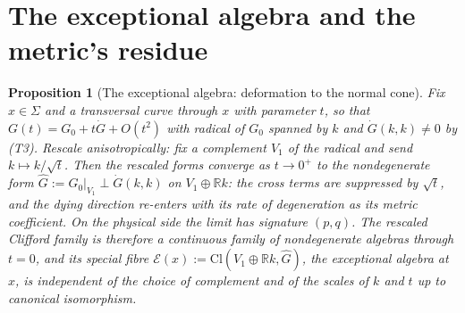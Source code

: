 \documentclass[11pt]{article}
\newtheorem{proposition}[theorem]{Proposition}
\theoremstyle{definition}
\theoremstyle{plain}
\newcommand{\changedmark}[2]{\marginpar{\raggedright\scriptsize\color{#1}#2}}
\providecommand{\Cl}{}\renewcommand{\Cl}{\mathrm{Cl}}
\providecommand{\R}{}\renewcommand{\R}{\mathbb{R}}
\providecommand{\Sig}{}\renewcommand{\Sig}{\Sigma}
\providecommand{\shE}{}\renewcommand{\shE}{\mathcal{E}}
\begin{document}
\section{The exceptional algebra and the metric's residue}

\begin{proposition}[The exceptional algebra: deformation to the normal cone]\label{c:sheaf.exceptional-algebra-deformation-normal-cone}
\changedmark{gray}{reworded}
Fix $x \in \Sig$ and a transversal curve through $x$ with parameter $t$, so that $G(t) = G_0 + t\dot G + O(t^2)$ with radical of $G_0$ spanned by $k$ and $\dot G(k,k) \neq 0$ by (T3). Rescale anisotropically: fix a complement $V_1$ of the radical and send $k \mapsto k/\sqrt{t}$. Then the rescaled forms converge as $t \to 0^+$ to the nondegenerate form $\hat G := G_0|_{V_1} \perp \dot G(k,k)$ on $V_1 \oplus \R k$: the cross terms are suppressed by $\sqrt{t}$, and the dying direction re-enters with its rate of degeneration as its metric coefficient. On the physical side the limit has signature $(p, q)$. The rescaled Clifford family is therefore a continuous family of nondegenerate algebras through $t = 0$, and its special fibre $\shE(x) := \Cl(V_1 \oplus \R k, \hat G)$, the \emph{exceptional algebra} at $x$, is independent of the choice of complement and of the scales of $k$ and $t$ up to canonical isomorphism.
\end{proposition}
\end{document}

